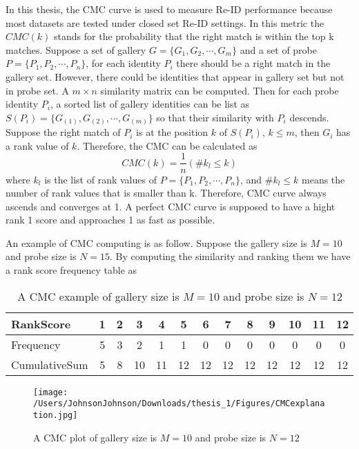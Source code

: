In this thesis, the CMC curve is used to measure Re-ID performance because most datasets are tested under closed set Re-ID settings. In this metric the $CMC(k)$ stands for the probability that the right match is within the top k matches. Suppose a set of gallery $G = \{G_1,G_2,\cdots,G_m\}$ and a set of probe $P = \{P_1,P_2,\cdots,P_n\}$, for each identity $P_i$ there should be a right match in the gallery set. However, there could be identities that appear in gallery set but not in probe set. A $m\times n$ similarity matrix can be computed. Then for each probe identity $P_i$, a sorted list of gallery identities can be list as $S(P_i) = \{{G_{(1)},G_{(2)},\cdots,G_{(m)}}\}$ so that their similarity with $P_i$ descends. Suppose the right match of $P_i$ is at the position $k$ of $S(P_i)$, $k\le m$, then $G_i$ has a rank value of $k$. Therefore, the CMC can be calculated as 
\begin{equation}
CMC(k) = \frac{1}{n}(\#k_l\le k)
\end{equation}
where $k_l$ is the list of rank values of $P = \{P_1,P_2,\cdots,P_n\}$, and $\#k_l\le k$ means the number of rank values that is smaller than k.  Therefore, CMC curve always ascends and converges at 1.  A perfect CMC curve is supposed to have a hight rank 1 score and approaches 1 as fast as possible.

An example of CMC computing is as follow. Suppose the gallery size is $M=10$ and probe size is $N=15$. By computing the similarity and ranking them we have a rank score frequency table as
\begin{table}[H]
\centering
\caption{A CMC example of gallery size is $M=10$ and probe size is $N=12$}
\begin{tabular}{|l|c|c|c|c|c|c|c|c|c|c|c|c|}
\hline
RankScore &1&2&3&4&5&6&7&8&9&10&11&12\\
\hline
Frequency &5&3&2&1&1&0&0&0&0&0&0&0\\
\hline
CumulativeSum&5&8&10&11&12&12&12&12&12&12&12&12\\
\hline
\end{tabular}
\end{table}

\begin{figure}[H]
\centering
\texttt{[image: /Users/JohnsonJohnson/Downloads/thesis\_1/Figures/CMCexplanation.jpg]}
\caption{A CMC plot of  gallery size is $M=10$ and probe size is $N=12$}
\label{CMCexplanationplot}
\vspace{-1em}
\end{figure} 






